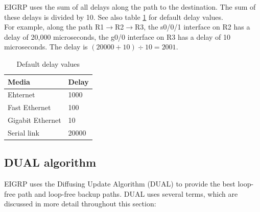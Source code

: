 EIGRP uses the sum of all delays along the path to the destination. The sum of these delays is divided by 10. See also table \ref{delay-value} for default delay values.\\

For example, along the path R1$\rightarrow$R2$\rightarrow$R3, the s0/0/1 interface on R2 has a delay of 20,000 microseconds, the g0/0 interface on R3 has a delay of 10 microseconds. The delay is $ \left( 20000 + 10 \right) \div 10 = 2001 $.

\begin{table}[h!]
\centering
\caption{Default delay values}
\label{delay-value}
\begin{tabular}{|l|l|}
\hline
Media            & Delay \\ \hline
Ehternet         & 1000  \\ \hline
Fast Ethernet    & 100   \\ \hline
Gigabit Ethernet & 10    \\ \hline
Serial link      & 20000 \\ \hline
\end{tabular}
\end{table}

\subsection{DUAL algorithm}

EIGRP uses the Diffusing Update Algorithm (DUAL) to provide the best loop-free path and loop-free backup paths. DUAL uses several terms, which are discussed in more detail throughout this section:

